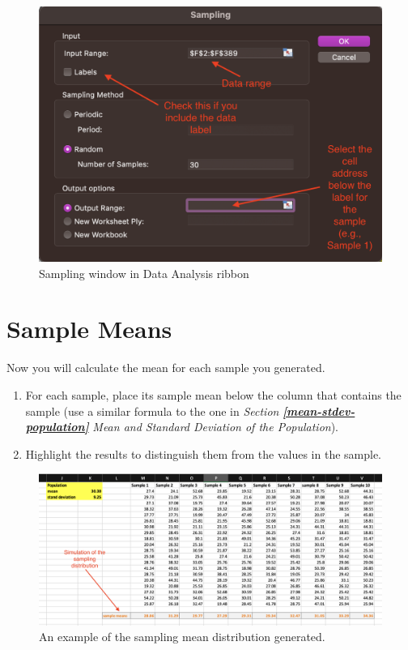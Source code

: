 \documentclass[
  12pt,
  letterpaper,
]{book}
\providecommand{\tightlist}{%
  \setlength{\itemsep}{0pt}\setlength{\parskip}{0pt}}
\begin{document}
\begin{figure}

{\centering \includegraphics[width=0.75\linewidth]{images/data-analysis-sampling} 

}

\caption{Sampling window in Data Analysis ribbon}\label{fig:data-analysis-sampling}
\end{figure}

\hypertarget{mean-samples}{%
\section{Sample Means}\label{mean-samples}}

Now you will calculate the mean for each sample you generated.

\begin{enumerate}
\def\labelenumi{\arabic{enumi}.}
\tightlist
\item
  For each sample, place its sample mean below the column that contains the sample (use a similar formula to the one in \emph{Section} \textbf{\emph{\ref{mean-stdev-population}}} \emph{Mean and Standard Deviation of the Population}).
\item
  Highlight the results to distinguish them from the values in the sample.
\end{enumerate}

\begin{figure}

{\centering \includegraphics[width=1\linewidth]{images/simualation-sampling-distribution} 

}

\caption{An example of the sampling mean distribution generated.}\label{fig:simualation-sampling-distribution}
\end{figure}
\end{document}
